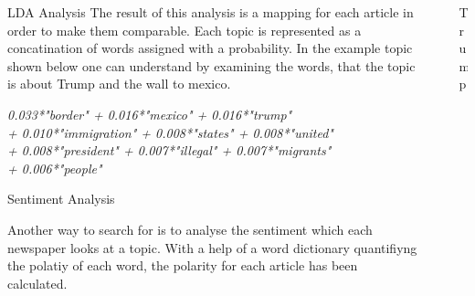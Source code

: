 \documentclass[final]{beamer}
\newlength{\sepwid}
\newlength{\onecolwid}
\newlength{\twocolwid}
\begin{document}
\begin{frame}[t]
\begin{columns}[t]
\begin{column}{\onecolwid}
\begin{block}{LDA Analysis}
     The result of this analysis is a mapping for each article in order to make them comparable. Each topic is represented as a concatination of words assigned with a probability. In the example topic shown below one can understand by examining the words, that the topic is about Trump and the wall to mexico. \linebreak
     
     \textit{0.033*"border" + 0.016*"mexico" + 0.016*"trump" \\
    + 0.010*"immigration" + 0.008*"states" + 0.008*"united" \\
    + 0.008*"president" + 0.007*"illegal" + 0.007*"migrants" \\
    + 0.006*"people"}


       \end{block}

    \begin{block}{Sentiment Analysis}

        Another way to search for is to analyse the sentiment which each newspaper looks at a topic.
        With a help of a word dictionary quantifiyng the polatiy of each word, the polarity for each article has been calculated.\cite{vader}

    \end{block}

\end{column} %


\begin{column}{\sepwid}\end{column} %

\begin{column}{\twocolwid} %


\begin{block}{Trump}


\end{block}
\end{column}
\end{columns}
\end{frame}
\end{document}
